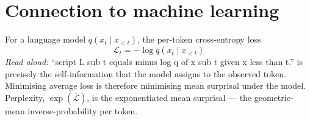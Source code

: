 \documentclass[11pt]{article}
\theoremstyle{definition}
\theoremstyle{remark}
\begin{document}
\section{Connection to machine learning}

For a language model $q(x_t \mid x_{<t})$, the per-token cross-entropy
loss
\[
  \mathcal{L}_t = -\log q(x_t \mid x_{<t})
\]
\emph{Read aloud:} ``script L sub t equals minus log q of x sub t given x less than t.''
is precisely the self-information that the model assigns to the observed
token. Minimising average loss is therefore minimising mean surprisal under
the model. Perplexity, $\exp(\overline{\mathcal{L}})$, is the
exponentiated mean surprisal --- the geometric-mean inverse-probability
per token.
\end{document}
